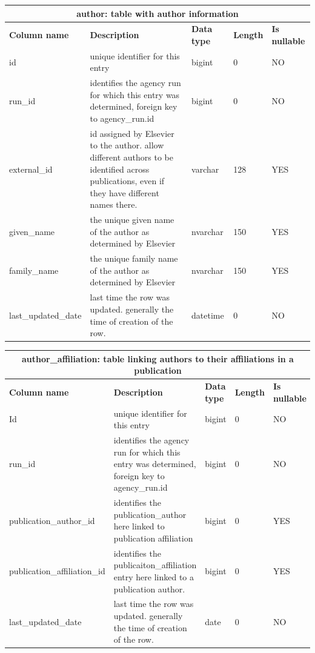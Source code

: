 \documentclass[titlepage, 11pt]{article}
\begin{document}
{\begin{table}[h!]
{\renewcommand{\arraystretch}{1.5}%
\begin{tabularx}{1\textwidth} {|p{3cm}|p{5.33cm}|p{2cm}|p{2cm}|p{2cm}|}
 \hline
 \multicolumn{5}{|c|}{\textbf{author: table with author information}}\\
 \hline
 \textbf{Column name} & \textbf{Description} & \textbf{Data type} & \textbf{Length} & \textbf{Is nullable} \\
 \hline
 id & unique identifier for this entry & bigint   & 0   & NO  \\
 \hline
 run\_id & identifies the agency run for which this entry was determined, foreign key to agency\_run.id & bigint  & 0  & NO  \\
 \hline
 external\_id & id assigned by Elsevier to the author. allow different authors to be identified across publications, even if they have different names there. & varchar & 128 & YES \\
 \hline
 given\_name  & the unique given name of the author as determined by Elsevier & nvarchar & 150 & YES \\
 \hline
 family\_name & the unique family name of the author as determined by Elsevier & nvarchar & 150 & YES \\
 \hline
 last\_updated\_date & last time the row was updated. generally the time of creation of the row. & datetime & 0 & NO\\
\hline
\end{tabularx}
\label{table: appendix b - author}
}
\end{table}

\begin{table}[h!]

{\renewcommand{\arraystretch}{1.5}%
\begin{tabularx}{1\textwidth} {|p{4cm}|p{5.33cm}|p{2cm}|p{1.5cm}|p{1.5cm}|}
 \hline
 \multicolumn{5}{|c|}{\textbf{author\_affiliation: table linking authors to their affiliations in a publication}}\\
 \hline
 \textbf{Column name} & \textbf{Description} & \textbf{Data type} & \textbf{Length} & \textbf{Is nullable} \\
 \hline
 Id & unique identifier for this entry & bigint & 0 & NO  \\
 \hline
 run\_id & identifies the agency run for which this entry was determined, foreign key to agency\_run.id & bigint & 0 & NO  \\
 \hline
 publication\_author\_id & identifies the publication\_author here linked to publication affiliation & bigint & 0 & YES \\
 \hline
 publication\_affiliation\_id & identifies the publicaiton\_affiliation entry here linked to a publication author. & bigint & 0 & YES \\
 \hline
 last\_updated\_date & last time the row was updated. generally the time of creation of the row. & date  & 0 & NO  \\
\hline


\end{tabularx}}
\end{table}}
\end{document}
